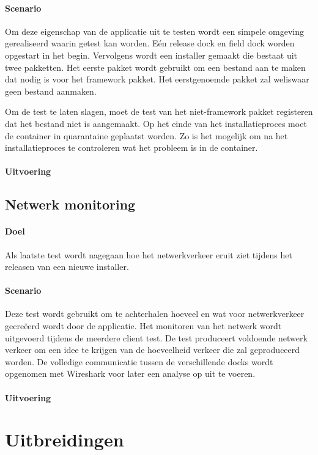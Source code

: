 \paragraph{Scenario}
Om deze eigenschap van de applicatie uit te testen wordt een simpele omgeving gerealiseerd waarin getest kan worden.
Eén release dock en field dock worden opgestart in het begin.
Vervolgens wordt een installer gemaakt die bestaat uit twee pakketten.
Het eerste pakket wordt gebruikt om een bestand aan te maken dat nodig is voor het framework pakket.
Het eerstgenoemde pakket zal weliswaar geen bestand aanmaken.

Om de test te laten slagen, moet de test van het niet-framework pakket registeren dat het bestand niet is aangemaakt.
Op het einde van het installatieproces moet de container in quarantaine geplaatst worden.
Zo is het mogelijk om na het installatieproces te controleren wat het probleem is in de container.

\paragraph{Uitvoering}


\subsection{Netwerk monitoring}
\paragraph{Doel}
Als laatste test wordt nagegaan hoe het netwerkverkeer eruit ziet tijdens het releasen van een nieuwe installer.

\paragraph{Scenario}
Deze test wordt gebruikt om te achterhalen hoeveel en wat voor netwerkverkeer gecreëerd wordt door de applicatie.
Het monitoren van het netwerk wordt uitgevoerd tijdens de meerdere client test.
De test produceert voldoende netwerk verkeer om een idee te krijgen van de hoeveelheid verkeer die zal geproduceerd worden.
De volledige communicatie tussen de verschillende docks wordt opgenomen met Wireshark voor later een analyse op uit te voeren.

\paragraph{Uitvoering}


\section{Uitbreidingen}



